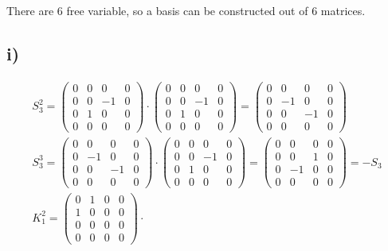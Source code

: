 \documentclass[]{scrartcl}
\begin{document}
There are $6$ free variable, so a basis can be constructed out of $6$ matrices.

\subsection{i)}

\begin{gather*}
	S_3^2 = 
	\begin{pmatrix}
		0 & 0 & 0 & 0\\
		0 & 0 & -1& 0\\
		0 & 1 & 0 & 0\\ 
		0 & 0 & 0 & 0
	\end{pmatrix}\cdot
	\begin{pmatrix}
		0 & 0 & 0 & 0\\
		0 & 0 & -1& 0\\
		0 & 1 & 0 & 0\\ 
		0 & 0 & 0 & 0
	\end{pmatrix} =
	\begin{pmatrix}
		0 & 0 & 0 & 0\\
		0 & -1& 0 & 0\\
		0 & 0 & -1& 0\\ 
		0 & 0 & 0 & 0
	\end{pmatrix}\\
	S_3^3 = \begin{pmatrix}
		0 & 0 & 0 & 0\\
		0 & -1& 0 & 0\\
		0 & 0 & -1& 0\\ 
		0 & 0 & 0 & 0
	\end{pmatrix}\cdot
	\begin{pmatrix}
		0 & 0 & 0 & 0\\
		0 & 0 & -1& 0\\
		0 & 1 & 0 & 0\\ 
		0 & 0 & 0 & 0
	\end{pmatrix} = 
	\begin{pmatrix}
		0 & 0 & 0 & 0\\
		0 & 0 & 1& 0\\
		0 & -1 & 0 & 0\\ 
		0 & 0 & 0 & 0
	\end{pmatrix} = -S_3\\
	K_1^2 = 
	\begin{pmatrix}
		0 & 1 & 0 & 0\\
		1 & 0 & 0 & 0\\
		0 & 0 & 0 & 0\\ 
		0 & 0 & 0 & 0
	\end{pmatrix} \cdot 

\end{gather*}
\end{document}
